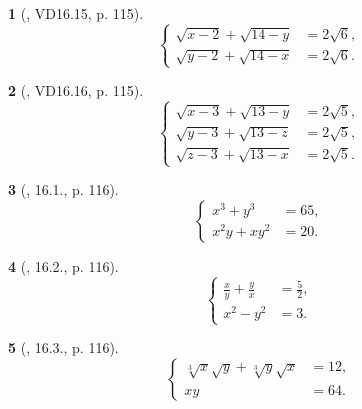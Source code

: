 \documentclass{article}
\newtheorem{baitoan}{}
\begin{document}
\begin{baitoan}[\cite{TLCT_THCS_Toan_9_dai_so}, VD16.15, p. 115]
	\begin{equation*}
		\left\{\begin{split}
			\sqrt{x - 2} + \sqrt{14 - y} &= 2\sqrt{6},\\
			\sqrt{y - 2} + \sqrt{14 - x} &= 2\sqrt{6}.
		\end{split}\right.
	\end{equation*}
\end{baitoan}

\begin{baitoan}[\cite{TLCT_THCS_Toan_9_dai_so}, VD16.16, p. 115]
	\begin{equation*}
		\left\{\begin{split}
			\sqrt{x - 3} + \sqrt{13 - y} &= 2\sqrt{5},\\
			\sqrt{y - 3} + \sqrt{13 - z} &= 2\sqrt{5},\\
			\sqrt{z - 3} + \sqrt{13 - x} &= 2\sqrt{5}.
		\end{split}\right.
	\end{equation*}
\end{baitoan}

\begin{baitoan}[\cite{TLCT_THCS_Toan_9_dai_so}, 16.1., p. 116]
	\begin{equation*}
		\left\{\begin{split}
			x^3 + y^3 &= 65,\\
			x^2y + xy^2 &= 20.
		\end{split}\right.
	\end{equation*}
\end{baitoan}

\begin{baitoan}[\cite{TLCT_THCS_Toan_9_dai_so}, 16.2., p. 116]
	\begin{equation*}
		\left\{\begin{split}
			\frac{x}{y} + \frac{y}{x} &= \frac{5}{2},\\
			x^2 - y^2 &= 3.
		\end{split}\right.
	\end{equation*}
\end{baitoan}

\begin{baitoan}[\cite{TLCT_THCS_Toan_9_dai_so}, 16.3., p. 116]
	\begin{equation*}
		\left\{\begin{split}
			\sqrt[3]{x}\sqrt{y} + \sqrt[3]{y}\sqrt{x} &= 12,\\
			xy &= 64.
		\end{split}\right.
	\end{equation*}
\end{baitoan}
\end{document}
